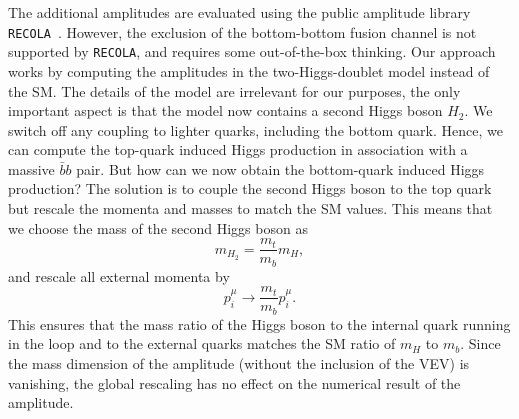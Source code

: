 The additional amplitudes are evaluated using the public amplitude library \texttt{RECOLA}~\cite{Actis:2016mpe}. However, the exclusion of the bottom-bottom fusion channel is not supported by \texttt{RECOLA}, and requires some out-of-the-box thinking. Our approach works by computing the amplitudes in the two-Higgs-doublet model instead of the \acs{SM}. The details of the model are irrelevant for our purposes, the only important aspect is that the model now contains a second Higgs boson $H_2$. We switch off any coupling to lighter quarks, including the bottom quark. Hence, we can compute the top-quark induced Higgs production in association with a massive $\bar{b} b$ pair. But how can we now obtain the bottom-quark induced Higgs production? The solution is to couple the second Higgs boson to the top quark but rescale the momenta and masses to match the \acs{SM} values. This means that we choose the mass of the second Higgs boson as
\begin{equation}
m_{H_2} = \frac{m_t}{m_b} m_H,
\end{equation}
and rescale all external momenta by
\begin{equation}
p_i^\mu \rightarrow \frac{m_t}{m_b} p_i^\mu.
\end{equation}
This ensures that the mass ratio of the Higgs boson to the internal quark running in the loop and to the external quarks matches the \acs{SM} ratio of $m_H$ to $m_b$. Since the mass dimension of the amplitude (without the inclusion of the \acs{VEV}) is vanishing, the global rescaling has no effect on the numerical result of the amplitude.

